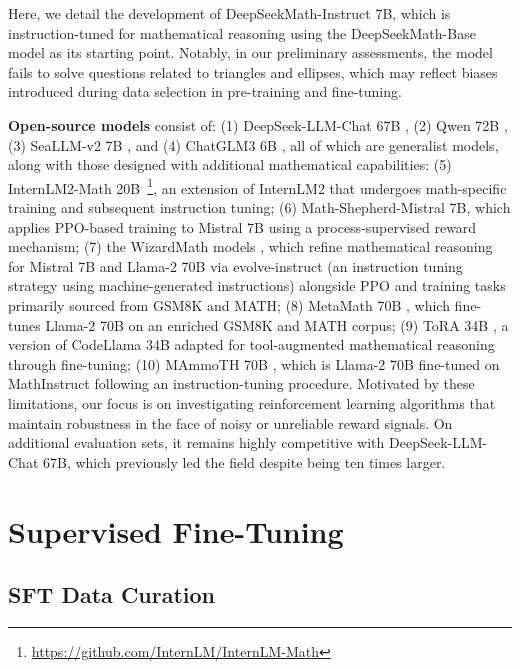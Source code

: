 Here, we detail the development of DeepSeekMath-Instruct 7B, which is instruction-tuned for mathematical reasoning using the DeepSeekMath-Base model as its starting point. Notably, in our preliminary assessments, the model fails to solve questions related to triangles and ellipses, which may reflect biases introduced during data selection in pre-training and fine-tuning. \item \textbf{Open-source models} consist of: (1) DeepSeek-LLM-Chat 67B \citep{deepseek-llm}, (2) Qwen 72B \citep{qwen}, (3) SeaLLM-v2 7B \citep{seallm}, and (4) ChatGLM3 6B \citep{chatglm3}, all of which are generalist models, along with those designed with additional mathematical capabilities: (5) InternLM2-Math 20B~\footnote{\url{https://github.com/InternLM/InternLM-Math}}, an extension of InternLM2 that undergoes math-specific training and subsequent instruction tuning; (6) Math-Shepherd-Mistral 7B, which applies PPO-based training \citep{schulman2017proximal} to Mistral 7B \citep{mistral} using a process-supervised reward mechanism; (7) the WizardMath models \citep{wizardmath}, which refine mathematical reasoning for Mistral 7B and Llama-2 70B \citep{llama2} via evolve-instruct (an instruction tuning strategy using machine-generated instructions) alongside PPO and training tasks primarily sourced from GSM8K and MATH; (8) MetaMath 70B \citep{metamath}, which fine-tunes Llama-2 70B on an enriched GSM8K and MATH corpus; (9) ToRA 34B \cite{tora}, a version of CodeLlama 34B adapted for tool-augmented mathematical reasoning through fine-tuning; (10) MAmmoTH 70B \citep{MathInstruct}, which is Llama-2 70B fine-tuned on MathInstruct following an instruction-tuning procedure. Motivated by these limitations, our focus is on investigating reinforcement learning algorithms that maintain robustness in the face of noisy or unreliable reward signals. On additional evaluation sets, it remains highly competitive with DeepSeek-LLM-Chat 67B, which previously led the field despite being ten times larger. \section{Supervised Fine-Tuning}

\subsection{SFT Data Curation}

